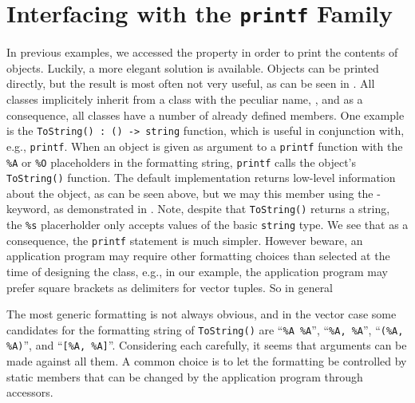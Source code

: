 \documentclass[fsharpNotes.tex]{subfiles}
\begin{document}
\section{Interfacing with the \lstinline{printf} Family}
In previous examples, we accessed the property in order to print the contents of objects. Luckily, a more elegant solution is available. Objects can be printed directly, but the result is most often not very useful, as can be seen in .
%
%
All classes implicitely inherit from a class with the peculiar name, , and as a consequence, all classes have a number of already defined members. One example is the \lstinline{ToString() : () -> string} function, which is useful in conjunction with, e.g., \lstinline{printf}. When an object is given as argument to a \lstinline{printf} function with the \lstinline{%A} %
  or \lstinline{%O} %
    placeholders in the formatting string, \lstinline{printf} calls the object's \lstinline{ToString()} function. The default implementation returns low-level information about the object, as can be seen above, but we may 
    this member using the -keyword, as demonstrated in . Note, despite that \lstinline{ToString()} returns a string, the \lstinline{%s} %
      placerholder only accepts values of the basic \lstinline{string} type.
%
%
We see that as a consequence, the \lstinline{printf} statement is much simpler. However beware, an application program may require other formatting choices than selected at the time of designing the class, e.g., in our example, the application program may prefer square brackets as delimiters for vector tuples.  So in general  

The most generic formatting is not always obvious, and in the vector case some candidates for the formatting string of \lstinline{ToString()} are ``\lstinline{%A %A}'', ``\lstinline{%A, %A}'', ``\lstinline{(%A, %A)}'', and ``\lstinline{[%A, %A]}''.
 Considering each carefully, it seems that arguments can be made against all them. A common choice is to let the formatting be controlled by static members that can be changed by the application program through accessors.
\end{document}
